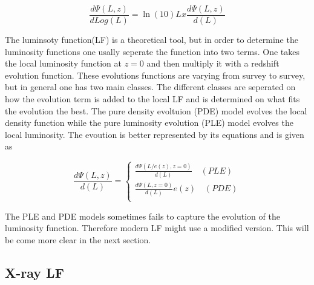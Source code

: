 \documentclass{article}
\begin{document}
\begin{equation}
    \frac{d\Psi(L,z)}{dLog(L)} =  \ln (10)  Lx \frac{d\Psi(L,z)}{d(L)}
\end{equation}


The luminsoty function(LF) is a theoretical tool, but in order to determine the luminosity functions one usally seperate the function into two terms. 
One takes the local luminosity function at $z=0$ and then multiply it with a redshift evolution function. These evolutions functions
are varying from survey to survey, but in general one has two main classes. 
The different classes are seperated on how the evolution term is added to the local LF and is determined on what fits the evolution the best. 
The pure density evoltuion (PDE) model evolves the local density function while the pure luminosity evolution (PLE) model evolves the local luminosity.
The evoution is better represented by its equations and is given as 

\begin{equation}\frac{d\Psi(L,z)}{d(L)} = 
    \begin{cases}
        \frac{d\Psi(L/e(z),z=0)}{d(L)} \quad (PLE)\\
        \frac{d\Psi(L,z=0)}{d(L)}e(z) \quad (PDE)\\
    \end{cases}
\end{equation}

The PLE and PDE models sometimes fails to capture the evolution of the luminosity function. Therefore modern 
LF might use a modified version. This will be come more clear in the next section.

\subsection{X-ray LF}
\end{document}
